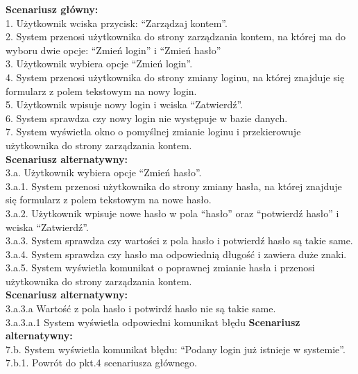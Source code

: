 \begin{enumerate}[label=(\Roman*)]
\textbf{Scenariusz główny:}\\
	1. Użytkownik wciska przycisk: “Zarządzaj kontem”.\\
	2. System przenosi użytkownika do strony zarządzania kontem, na której ma do wyboru
	dwie opcje: “Zmień login” i “Zmień hasło”\\
	3. Użytkownik wybiera opcje “Zmień login”.\\
	4. System przenosi użytkownika do strony zmiany loginu, na której znajduje się
	formularz z polem tekstowym na nowy login.\\
	5. Użytkownik wpisuje nowy login i wciska “Zatwierdź”.\\
	6. System sprawdza czy nowy login nie występuje w bazie danych.\\
	7. System wyświetla okno o pomyślnej zmianie loginu i przekierowuje użytkownika do
strony zarządzania kontem.\\
\textbf{Scenariusz alternatywny:}\\
3.a. Użytkownik wybiera opcje “Zmień hasło”.\\
3.a.1. System przenosi użytkownika do strony zmiany hasła, na której znajduje się formularz
z polem tekstowym na nowe hasło.\\
3.a.2. Użytkownik wpisuje nowe hasło w pola “hasło” oraz “potwierdź hasło” i wciska
“Zatwierdź”.\\
3.a.3. System sprawdza czy wartości z pola hasło i potwierdź hasło są takie same.\\
3.a.4. System sprawdza czy hasło ma odpowiednią długość i zawiera duże znaki.\\
3.a.5. System wyświetla komunikat o poprawnej zmianie hasła i przenosi użytkownika do
strony zarządzania kontem.\\
\textbf{Scenariusz alternatywny:}\\
3.a.3.a Wartość z pola hasło i potwirdź hasło nie są takie same.\\
3.a.3.a.1 System wyświetla odpowiedni komunikat błędu
\textbf{Scenariusz alternatywny:}\\
7.b. System wyświetla komunikat błędu: “Podany login już istnieje w systemie”.\\
7.b.1. Powrót do pkt.4 scenariusza głównego.\\


\end{enumerate}
